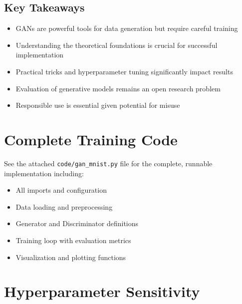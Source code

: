\documentclass[12pt,a4paper]{article}
\begin{document}
\subsection{Key Takeaways}

\begin{itemize}
    \item GANs are powerful tools for data generation but require careful training
    \item Understanding the theoretical foundations is crucial for successful implementation
    \item Practical tricks and hyperparameter tuning significantly impact results
    \item Evaluation of generative models remains an open research problem
    \item Responsible use is essential given potential for misuse
\end{itemize}

\appendix
\section{Complete Training Code} \label{app:code}

See the attached \texttt{code/gan\_mnist.py} file for the complete, runnable implementation including:
\begin{itemize}
    \item All imports and configuration
    \item Data loading and preprocessing
    \item Generator and Discriminator definitions
    \item Training loop with evaluation metrics
    \item Visualization and plotting functions
\end{itemize}

\section{Hyperparameter Sensitivity} \label{app:hyperparams}
\end{document}
